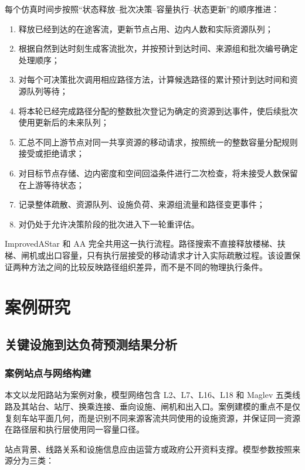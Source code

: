 \documentclass[UTF8,a4paper,12pt]{ctexart}
\begin{document}
每个仿真时间步按照“状态释放--批次决策--容量执行--状态更新”的顺序推进：
\begin{enumerate}
    \item 释放已经到达的在途客流，更新节点占用、边内人数和实际资源队列；
    \item 根据自然到达时刻生成客流批次，并按预计到达时间、来源组和批次编号确定处理顺序；
    \item 对每个可决策批次调用相应路径方法，计算候选路径的累计预计到达时间和资源队列等待；
    \item 将本轮已经完成路径分配的整数批次登记为确定的资源到达事件，使后续批次使用更新后的未来队列；
    \item 汇总不同上游节点对同一共享资源的移动请求，按照统一的整数容量分配规则接受或拒绝请求；
    \item 对目标节点存储、边内密度和空间回溢条件进行二次检查，将未接受人数保留在上游等待状态；
    \item 记录整体疏散、资源队列、设施负荷、来源组流量和路径变更事件；
    \item 对仍处于允许决策阶段的批次进入下一轮重评估。
\end{enumerate}

ImprovedAStar 和 AA 完全共用这一执行流程。路径搜索不直接释放楼梯、扶梯、闸机或出口容量，只有执行层接受的移动请求才计入实际疏散过程。该设置保证两种方法之间的比较反映路径组织差异，而不是不同的物理执行条件。

\section{案例研究}

\subsection{关键设施到达负荷预测结果分析}

\subsubsection{案例站点与网络构建}

本文以龙阳路站为案例对象，模型网络包含 L2、L7、L16、L18 和 Maglev 五类线路及其站台、站厅、换乘连接、垂向设施、闸机和出入口。案例建模的重点不是仅复刻车站平面几何，而是识别不同来源客流共同使用的设施资源，并保证同一资源在路径层和执行层使用同一容量口径。

站点背景、线路关系和设施信息应由运营方或政府公开资料支撑。模型参数按照来源分为三类：
\end{document}
